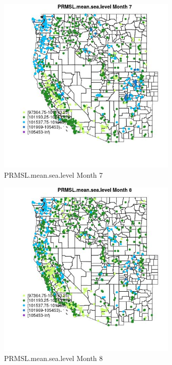 \begin{figure} 
\centering  
\includegraphics[width=0.77\textwidth]{Code_Outputs/Report_ML_input_PM25_Step4_part_f_de_duplicated_aveswNAs_MapObsMo7PRMSLmeansealevel.jpg} 
\caption{\label{fig:Report_ML_input_PM25_Step4_part_f_de_duplicated_aveswNAsMapObsMo7PRMSLmeansealevel}PRMSL.mean.sea.level Month 7} 
\end{figure} 
 

\begin{figure} 
\centering  
\includegraphics[width=0.77\textwidth]{Code_Outputs/Report_ML_input_PM25_Step4_part_f_de_duplicated_aveswNAs_MapObsMo8PRMSLmeansealevel.jpg} 
\caption{\label{fig:Report_ML_input_PM25_Step4_part_f_de_duplicated_aveswNAsMapObsMo8PRMSLmeansealevel}PRMSL.mean.sea.level Month 8} 
\end{figure} 
 


